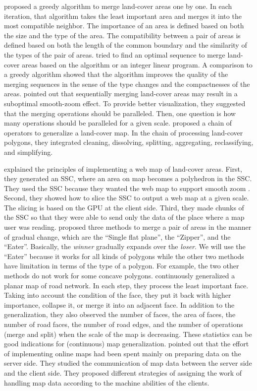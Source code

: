 \documentclass[ijgi,article,submit,moreauthors,pdftex]{Definitions/mdpi}
\begin{document}
\citet{vanOosterom2005} proposed a greedy algorithm 
to merge land-cover areas one by one.
In each iteration, that algorithm takes the least important area and 
merges it into the most compatible neighbor.
The importance of an area is defined 
based on both the size and the type of the area.
The compatibility between a pair of areas is defined based on 
both the length of the common boundary and the similarity of the types 
of the pair of areas. 
\citet[]{Peng2019Thesis} tried to find an optimal sequence 
to merge land-cover areas
based on the \Astar algorithm or an integer linear program.
A comparison to a greedy algorithm showed that 
the \Astar algorithm improves the quality of the merging sequences
in the sense of the type changes and the compactnesses of the areas.
\citet{vanOosterom2014Support} pointed out that sequentially merging
land-cover areas may result in a suboptimal smooth-zoom effect.
To provide better visualization, they suggested that
the merging operations should be paralleled.
Then, one question is how many operations 
should be paralleled for a given scale.
\citet{Thiemann2018LandCover} proposed a chain of operators 
to generalize a land-cover map.
In the chain of processing land-cover polygons, 
they integrated cleaning, dissolving, splitting, aggregating, reclassifying, and simplifying. 


\citet{Meijers2020Web} explained the principles of 
implementing a web map of land-cover areas.
First, they generated an SSC, 
where an area on map becomes a polyhedron in the SSC.
They used the SSC because 
they wanted the web map to support smooth zoom
\citep[see][]{vanOosterom2014Support}.
Second, they showed how to slice the SSC 
to output a web map at a given scale.
The slicing is based on the GPU at the client side.
Third, they made chunks of the SSC 
so that they were able to send only the data of the place
where a map user was reading.
\citet{Suba2014Merge} proposed three methods 
to merge a pair of areas in the manner of gradual change, 
which are the ``Single flat plane'', the ``Zipper'', and the ``Eater''.
Basically, the \emph{winner} gradually expands over the \emph{loser}.
We will use the ``Eater'' because it works for all kinds of polygons 
while the other two methods have limitation 
in terms of the type of a polygon.
For example, the two other methods do not work for some concave polygons.
\citet{Suba2016Road} continuously generalized a planar map of road network.
In each step, they process the least important face.
Taking into account the condition of the face,
they put it back with higher importance, collapse it, 
or merge it into an adjacent face.
In addition to the generalization, 
they also observed the number of faces,
the area of faces, the number of road faces, the number of road edges,
and the number of operations (merge and split) 
when the scale of the map is decreasing.
These statistics can be good indications 
for (continuous) map generalization.
\citet{Huang2016Webmap} pointed out that
the effort of implementing online maps 
had been spent mainly on preparing data on the server side.
They studied the communication of map data 
between the server side and the client side.
They proposed different strategies of assigning 
the work of handling map data
according to the machine abilities of the clients.
\end{document}
